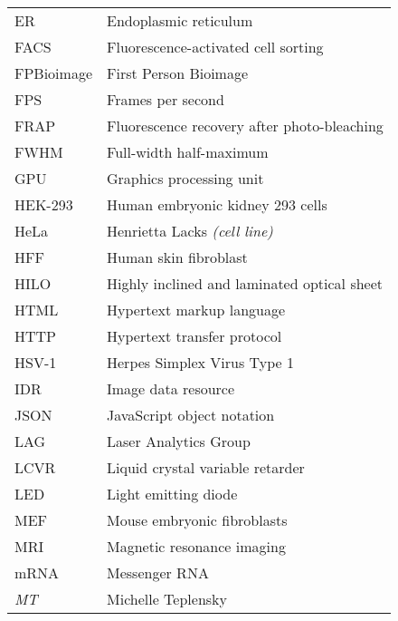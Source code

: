 \begin{flushleft}
\begin{longtable}[l]{|p{5.5em}|p{25em}|}
ER         & Endoplasmic reticulum                                      \\
FACS       & Fluorescence-activated cell sorting                        \\
FPBioimage & First Person Bioimage                                      \\
FPS        & Frames per second                                          \\
FRAP       & Fluorescence recovery after photo-bleaching                \\
FWHM       & Full-width half-maximum                                    \\
GPU        & Graphics processing unit                                   \\
HEK-293    & Human embryonic kidney 293 cells                           \\
HeLa       & Henrietta Lacks \textit{(cell line)}                       \\
HFF        & Human skin fibroblast                                      \\
HILO	   & Highly inclined and laminated optical sheet				\\
HTML       & Hypertext markup language                                  \\
HTTP       & Hypertext transfer protocol                                \\
HSV-1	   & Herpes Simplex Virus Type 1								\\
IDR        & Image data resource                                        \\
JSON       & JavaScript object notation                                 \\
LAG        & Laser Analytics Group                                      \\
LCVR       & Liquid crystal variable retarder                           \\
LED        & Light emitting diode                                       \\
MEF        & Mouse embryonic fibroblasts                                \\
MRI        & Magnetic resonance imaging                                 \\
mRNA       & Messenger RNA                                              \\
\textit{MT} & Michelle Teplensky                                        \\

\end{longtable}
\end{flushleft}

